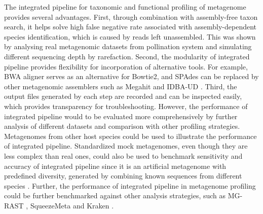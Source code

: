 \documentclass[11pt]{article}
\begin{document}
\newline
The integrated pipeline for taxonomic and functional profiling of metagenome provides several advantages. 
First, through combination with assembly-free taxon search, it helps solve high false negative rate associated with assembly-dependent species identification, which is caused by reads left unassembled. 
This was shown by analysing real metagenomic datasets from pollination system and simulating different sequencing depth by rarefaction. 
Second, the modularity of integrated pipeline provides flexibility for incorporation of alternative tools. 
For example, BWA aligner \citep{li2009fast} serves as an alternative for Bowtie2, and SPAdes can be replaced by other metagenomic assemblers such as Megahit \citep{li2015megahit} and IDBA-UD \citep{peng2012idba}. 
Third, the output files generated by each step are recorded and can be inspected easily, which provides transparency for troubleshooting. 
However, the performance of integrated pipeline would to be evaluated more comprehensively by further analysis of different datasets and comparison with other profiling strategies. 
Metagenomes from other host species could be used to illustrate the performance of integrated pipeline. 
Standardized mock metagenomes, even though they are less complex than real ones, could also be used to benchmark sensitivity and accuracy of integrated pipeline since it is an artificial metagenome with predefined diversity, generated by combining known sequences from different species \citep{vollmers2017comparing,sczyrba2017critical,becker2020modular}. 
Further, the performance of integrated pipeline in metagenome profiling could be further benchmarked against other analysis strategies, such as MG-RAST \citep{meyer2008metagenomics}, SqueezeMeta \citep{tamames2019squeezemeta} and Kraken \citep{wood2014kraken}. 
\end{document}
